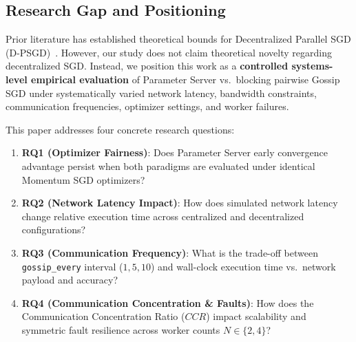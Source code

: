 \documentclass[conference]{IEEEtran}
\begin{document}
\subsection{Research Gap and Positioning}
Prior literature has established theoretical bounds for Decentralized Parallel SGD (D-PSGD)~\cite{lian2017can}. However, our study does not claim theoretical novelty regarding decentralized SGD. Instead, we position this work as a \textbf{controlled systems-level empirical evaluation} of Parameter Server vs.\ blocking pairwise Gossip SGD under systematically varied network latency, bandwidth constraints, communication frequencies, optimizer settings, and worker failures.

This paper addresses four concrete research questions:
\begin{enumerate}
    \item \textbf{RQ1 (Optimizer Fairness)}: Does Parameter Server early convergence advantage persist when both paradigms are evaluated under identical Momentum SGD optimizers?
    \item \textbf{RQ2 (Network Latency Impact)}: How does simulated network latency change relative execution time across centralized and decentralized configurations?
    \item \textbf{RQ3 (Communication Frequency)}: What is the trade-off between \texttt{gossip\_every} interval ($1, 5, 10$) and wall-clock execution time vs.\ network payload and accuracy?
    \item \textbf{RQ4 (Communication Concentration \& Faults)}: How does the Communication Concentration Ratio ($CCR$) impact scalability and symmetric fault resilience across worker counts $N \in \{2, 4\}$?
\end{enumerate}
\end{document}
